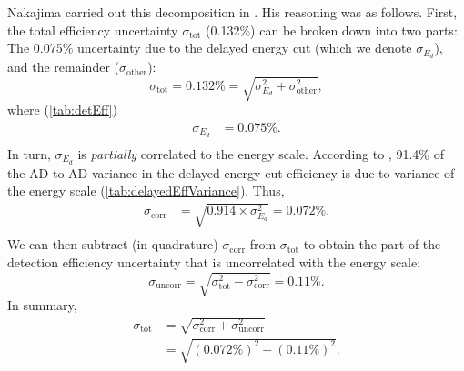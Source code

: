 \documentclass[../thesis.tex]{subfiles}
\begin{document}
Nakajima carried out this decomposition in \cite{P15A_inputs}. His reasoning was as follows. First, the total efficiency uncertainty $\sigma_{\mathrm{tot}}$ (0.132\%) can be broken down into two parts: The 0.075\% uncertainty due to the delayed energy cut (which we denote $\sigma_{E_d}$), and the remainder ($\sigma_{\mathrm{other}}$):
\begin{equation}
  \sigma_{\mathrm{tot}} = 0.132\% = \sqrt{\sigma^2_{E_d} + \sigma^2_{\mathrm{other}}},
\end{equation}
where (\autoref{tab:detEff})
\begin{equation}
  \begin{aligned}
    \sigma_{E_d} &= 0.075\%. \\
  \end{aligned}
\end{equation}
In turn, $\sigma_{E_d}$ is \emph{partially} correlated to the energy scale.
According to \cite{loganDetEff}, 91.4\% of the AD-to-AD variance in the delayed energy cut efficiency is due to variance of the energy scale (\autoref{tab:delayedEffVariance}). Thus,
\begin{equation}
  \begin{aligned}
    \sigma_{\mathrm{corr}} &= \sqrt{0.914 \times \sigma^2_{E_d}} = 0.072\%. \\
  \end{aligned}
\end{equation}
We can then subtract (in quadrature) $\sigma_{\mathrm{corr}}$ from $\sigma_{\mathrm{tot}}$ to obtain the part of the detection efficiency uncertainty that is uncorrelated with the energy scale:
\begin{equation}
  \sigma_{\mathrm{uncorr}} = \sqrt{\sigma^2_{\mathrm{tot}} - \sigma^2_{\mathrm{\mathrm{corr}}}} = 0.11\%.
\end{equation}
In summary,
\begin{equation}
  \begin{aligned}
    \sigma_{\mathrm{tot}} &= \sqrt{\sigma^2_{\mathrm{corr}} + \sigma^2_{\mathrm{uncorr}}} \\
    &= \sqrt{(0.072\%)^2 + (0.11\%)^2}.
  \end{aligned}
\end{equation}
\end{document}
